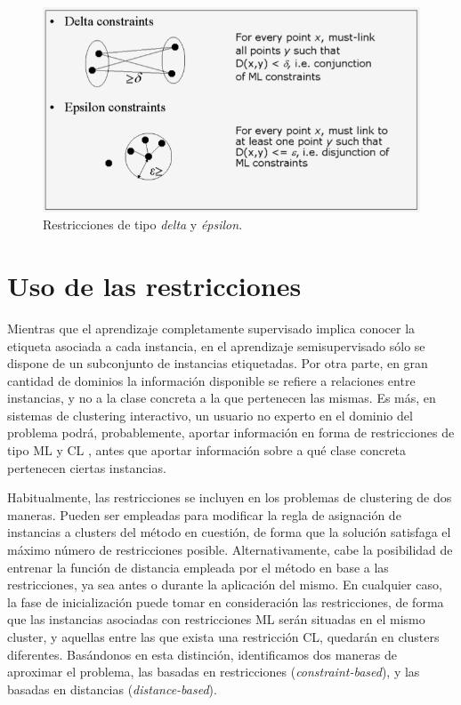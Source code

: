 \begin{figure}[!h]
	\centering
	\includegraphics[scale=0.45]{imagenes/c3/RestriccionesDeltaEpsilo.png} 
	\caption[Restricciones de tipo \textit{delta} y \textit{épsilon}.]{Restricciones de tipo \textit{delta} y \textit{épsilon}. \cite{Survey:2007}}\label{fig:figure4}
\end{figure}


\section{Uso de las restricciones}

Mientras que el aprendizaje completamente supervisado implica conocer la etiqueta asociada a cada instancia, en el aprendizaje semisupervisado sólo se dispone de un subconjunto de instancias etiquetadas. Por otra parte, en gran cantidad de dominios la información disponible se refiere a relaciones entre instancias, y no a la clase concreta a la que pertenecen las mismas. Es más, en sistemas de clustering interactivo, un usuario no experto en el dominio del problema podrá, probablemente, aportar información en forma de restricciones de tipo \acf{ML} y \acf{CL} \cite{Cohn:2003}\cite{DavidsonRavi:2007}, antes que aportar información sobre a qué clase concreta pertenecen ciertas instancias.

Habitualmente, las restricciones se incluyen en los problemas de clustering de dos maneras. Pueden ser empleadas para modificar la regla de asignación de instancias a clusters del método en cuestión, de forma que la solución satisfaga el máximo número de restricciones posible. Alternativamente, cabe la posibilidad de entrenar la función de distancia empleada por el método en base a las restricciones, ya sea antes o durante la aplicación del mismo. En cualquier caso, la fase de inicialización puede tomar en consideración las restricciones, de forma que las instancias asociadas con restricciones \acf{ML} serán situadas en el mismo cluster, y aquellas entre las que exista una restricción \acf{CL}, quedarán en clusters diferentes. Basándonos en esta distinción, identificamos dos maneras de aproximar el problema, las basadas en restricciones (\textit{constraint-based}), y las basadas en distancias (\textit{distance-based}).

